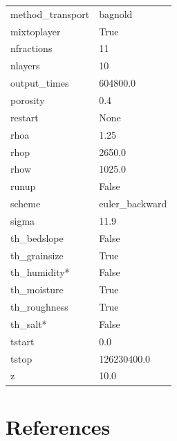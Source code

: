 \documentclass[preprint,12pt,authoryear]{elsarticle}
\begin{document}
\begin{longtable}{p{3cm} p{8cm}}
  method\_transport  & bagnold \\
  mixtoplayer       & True \\
  nfractions        & 11 \\
  nlayers           & 10 \\
  output\_times     & 604800.0 \\
  porosity          & 0.4 \\
  restart           & None \\
  rhoa              & 1.25 \\
  rhop              & 2650.0 \\
  rhow              & 1025.0 \\
  runup             & False \\
  scheme            & euler\_backward \\
  sigma             & 11.9 \\
  th\_bedslope      & False \\
  th\_grainsize     & True \\
  th\_humidity*     & False \\
  th\_moisture      & True \\
  th\_roughness     & True \\
  th\_salt*         & False \\
  tstart            & 0.0 \\
  tstop             & 126230400.0 \\
  z                 & 10.0 \\
  \hline
\end{longtable}

\section*{References}
{}
\end{document}
